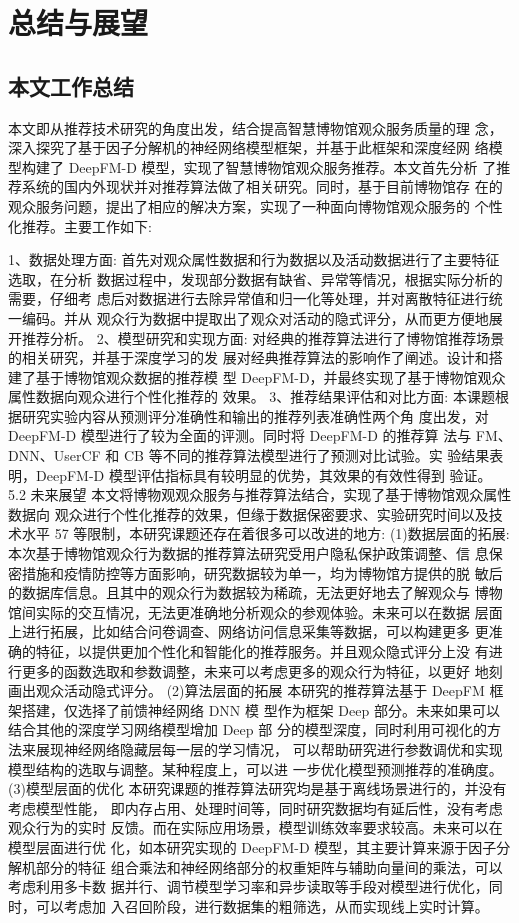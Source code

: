 
\chapter{总结与展望}
\section{本文工作总结}

本文即从推荐技术研究的角度出发，结合提高智慧博物馆观众服务质量的理 念，深入探究了基于因子分解机的神经网络模型框架，并基于此框架和深度经网 络模型构建了 DeepFM-D 模型，实现了智慧博物馆观众服务推荐。本文首先分析 了推荐系统的国内外现状并对推荐算法做了相关研究。同时，基于目前博物馆存 在的观众服务问题，提出了相应的解决方案，实现了一种面向博物馆观众服务的 个性化推荐。主要工作如下:

1、数据处理方面: 首先对观众属性数据和行为数据以及活动数据进行了主要特征选取，在分析
数据过程中，发现部分数据有缺省、异常等情况，根据实际分析的需要，仔细考 虑后对数据进行去除异常值和归一化等处理，并对离散特征进行统一编码。并从 观众行为数据中提取出了观众对活动的隐式评分，从而更方便地展开推荐分析。 2、模型研究和实现方面:
对经典的推荐算法进行了博物馆推荐场景的相关研究，并基于深度学习的发 展对经典推荐算法的影响作了阐述。设计和搭建了基于博物馆观众数据的推荐模 型 DeepFM-D，并最终实现了基于博物馆观众属性数据向观众进行个性化推荐的 效果。
3、推荐结果评估和对比方面:
本课题根据研究实验内容从预测评分准确性和输出的推荐列表准确性两个角 度出发，对 DeepFM-D 模型进行了较为全面的评测。同时将 DeepFM-D 的推荐算 法与 FM、DNN、UserCF 和 CB 等不同的推荐算法模型进行了预测对比试验。实 验结果表明，DeepFM-D 模型评估指标具有较明显的优势，其效果的有效性得到 验证。
5.2 未来展望
  本文将博物观观众服务与推荐算法结合，实现了基于博物馆观众属性数据向
观众进行个性化推荐的效果，但缘于数据保密要求、实验研究时间以及技术水平
57
等限制，本研究课题还存在着很多可以改进的地方: (1)数据层面的拓展:
  本次基于博物馆观众行为数据的推荐算法研究受用户隐私保护政策调整、信
息保密措施和疫情防控等方面影响，研究数据较为单一，均为博物馆方提供的脱
敏后的数据库信息。且其中的观众行为数据较为稀疏，无法更好地去了解观众与
博物馆间实际的交互情况，无法更准确地分析观众的参观体验。未来可以在数据
层面上进行拓展，比如结合问卷调查、网络访问信息采集等数据，可以构建更多
更准确的特征，以提供更加个性化和智能化的推荐服务。并且观众隐式评分上没
有进行更多的函数选取和参数调整，未来可以考虑更多的观众行为特征，以更好
地刻画出观众活动隐式评分。
(2)算法层面的拓展
本研究的推荐算法基于 DeepFM 框架搭建，仅选择了前馈神经网络 DNN 模
型作为框架 Deep 部分。未来如果可以结合其他的深度学习网络模型增加 Deep 部 分的模型深度，同时利用可视化的方法来展现神经网络隐藏层每一层的学习情况， 可以帮助研究进行参数调优和实现模型结构的选取与调整。某种程度上，可以进 一步优化模型预测推荐的准确度。
(3)模型层面的优化 本研究课题的推荐算法研究均是基于离线场景进行的，并没有考虑模型性能，
即内存占用、处理时间等，同时研究数据均有延后性，没有考虑观众行为的实时 反馈。而在实际应用场景，模型训练效率要求较高。未来可以在模型层面进行优 化，如本研究实现的 DeepFM-D 模型，其主要计算来源于因子分解机部分的特征 组合乘法和神经网络部分的权重矩阵与辅助向量间的乘法，可以考虑利用多卡数 据并行、调节模型学习率和异步读取等手段对模型进行优化，同时，可以考虑加 入召回阶段，进行数据集的粗筛选，从而实现线上实时计算。